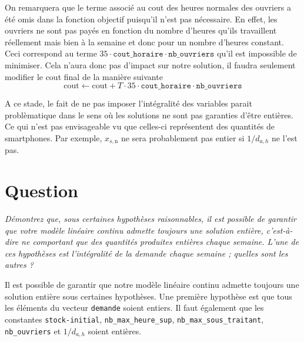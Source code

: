 \documentclass[12pt,oneside,a4paper]{article}
\newcommand{\question}
{
\addtocounter{section}{1}
\section*{Question \thesection}
}
\newcommand{\myX}[2]{x_{#1,\text{#2}}}
\newcommand{\xSemaine}[1]{\myX{s}{#1}}
\newcommand{\xn}{\xSemaine{n}}
\begin{document}
On remarquera que le terme associé au cout des heures normales des ouvriers
a été omis dans la fonction objectif puisqu'il n'est pas nécessaire.
En effet, les ouvriers ne sont pas payés en fonction du nombre
d'heures qu'ils travaillent réellement mais bien à la semaine et 
donc pour un nombre d'heures constant.
Ceci correspond au terme $35\cdot\texttt{cout\_horaire}\cdot
\texttt{nb\_ouvriers}$ qu'il est impossible de minimiser.
Cela n'aura donc pas d'impact sur notre solution,
il faudra seulement modifier le cout final de la manière suivante
\[ \text{cout} \leftarrow \text{cout} + T \cdot 35 \cdot\texttt{cout\_horaire}\cdot
\texttt{nb\_ouvriers} \]

A ce stade, le fait de ne pas imposer l'intégralité des variables
parait problèmatique dans le sens où les solutions ne sont pas 
garanties d'être entières. Ce qui n'est pas envisageable 
vu que celles-ci représentent des quantités de smartphones.
Par exemple, 
$\xn$ ne sera probablement pas entier si $1/d_{a,h}$ ne l'est pas.

\question %
\emph{Démontrez que, sous certaines hypothèses raisonnables, 
il est possible de garantir que votre modèle linéaire continu admette toujours
une solution entière, c'est-à-dire ne comportant que des quantités produites
entières chaque semaine. 
L'une de ces hypothèses est l'intégralité de la demande chaque semaine ; 
quelles sont les autres ?}

Il est possible de garantir que notre modèle linéaire continu
admette toujours une solution entière sous certaines hypothèses.
Une première hypothèse est que tous les éléments du 
vecteur \texttt{demande} soient entiers.
Il faut également que les constantes \texttt{stock-initial},
\texttt{nb\_max\_heure\_sup}, \texttt{nb\_max\_sous\_traitant},
\texttt{nb\_ouvriers} et $1/d_{a,h}$ soient entières.
\end{document}
